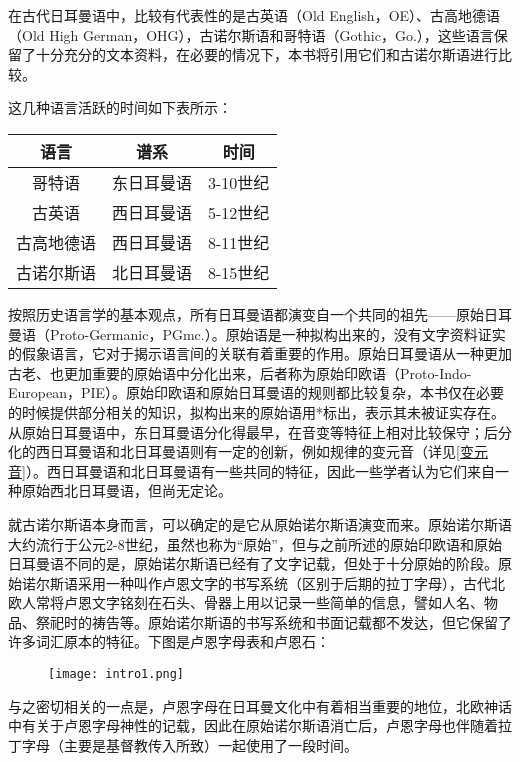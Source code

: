 在古代日耳曼语中，比较有代表性的是古英语（Old English，OE）、古高地德语（Old High German，OHG），古诺尔斯语和哥特语（Gothic，Go.），这些语言保留了十分充分的文本资料，在必要的情况下，本书将引用它们和古诺尔斯语进行比较。

这几种语言活跃的时间如下表所示：

\begin{table}[H]
\centering
\begin{tabular}{@{}ccc@{}}
\toprule
\textbf{语言} & \textbf{谱系} & \textbf{时间} \\ \midrule
哥特语         & 东日耳曼语       & 3-10世纪      \\
古英语         & 西日耳曼语       & 5-12世纪      \\
古高地德语       & 西日耳曼语       & 8-11世纪      \\
古诺尔斯语       & 北日耳曼语       & 8-15世纪      \\ \bottomrule
\end{tabular}
\end{table}

按照历史语言学的基本观点，所有日耳曼语都演变自一个共同的祖先——原始日耳曼语（Proto-Germanic，PGmc.）。原始语是一种拟构出来的，没有文字资料证实的假象语言，它对于揭示语言间的关联有着重要的作用。原始日耳曼语从一种更加古老、也更加重要的原始语中分化出来，后者称为原始印欧语（Proto-Indo-European，PIE）。原始印欧语和原始日耳曼语的规则都比较复杂，本书仅在必要的时候提供部分相关的知识，拟构出来的原始语用*标出，表示其未被证实存在。从原始日耳曼语中，东日耳曼语分化得最早，在音变等特征上相对比较保守；后分化的西日耳曼语和北日耳曼语则有一定的创新，例如规律的变元音（详见\ref{变元音}）。西日耳曼语和北日耳曼语有一些共同的特征，因此一些学者认为它们来自一种原始西北日耳曼语，但尚无定论。

就古诺尔斯语本身而言，可以确定的是它从原始诺尔斯语演变而来。原始诺尔斯语大约流行于公元2-8世纪，虽然也称为“原始”，但与之前所述的原始印欧语和原始日耳曼语不同的是，原始诺尔斯语已经有了文字记载，但处于十分原始的阶段。原始诺尔斯语采用一种叫作卢恩文字的书写系统（区别于后期的拉丁字母），古代北欧人常将卢恩文字铭刻在石头、骨器上用以记录一些简单的信息，譬如人名、物品、祭祀时的祷告等。原始诺尔斯语的书写系统和书面记载都不发达，但它保留了许多词汇原本的特征。下图是卢恩字母表和卢恩石：

\begin{figure}[H]
    \centering
    \texttt{[image: intro1.png]}
\end{figure}

与之密切相关的一点是，卢恩字母在日耳曼文化中有着相当重要的地位，北欧神话中有关于卢恩字母神性的记载，因此在原始诺尔斯语消亡后，卢恩字母也伴随着拉丁字母（主要是基督教传入所致）一起使用了一段时间。

